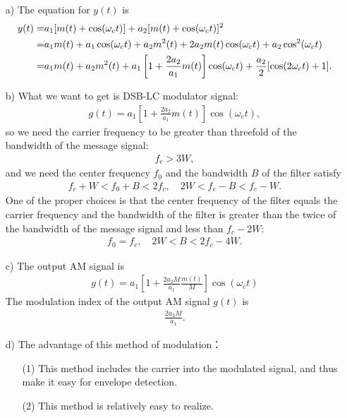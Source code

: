 \documentclass{assignment}
\begin{document}
\begin{sol}
    \begin{itemize}
        \item[a)] The equation for $y(t)$ is
        \begin{align}
            \notag y(t)=&a_1[m(t)+\cos(\omega_ct)]+a_2[m(t)+\cos(\omega_ct)]^2\\
            \notag=&a_1m(t)+a_1\cos(\omega_ct)+a_2m^2(t)+2a_2m(t)\cos(\omega_ct)+a_2\cos^2(\omega_ct)\\
            =&a_1m(t)+a_2m^2(t)+a_1\left[1+\frac{2a_2}{a_1}m(t)\right]\cos(\omega_ct)+\frac{a_2}{2}[\cos(2\omega_ct)+1].
        \end{align}
        \item[b)] What we want to get is DSB-LC modulator signal:
        \begin{align}
            g(t)=a_1\left[1+\frac{2a_2}{a_1}m(t)\right]\cos(\omega_ct),
        \end{align}
        so we need the carrier frequency to be greater than threefold of the bandwidth of the message signal:
        \begin{align}
            f_c>3W,
        \end{align}
        and we need the center frequency $f_0$ and the bandwidth $B$ of the filter satisfy
        \begin{align}
            f_c+W<f_0+B<2f_c,\quad 2W<f_c-B<f_c-W.
        \end{align}
        One of the proper choices is that the center frequency of the filter equals the carrier frequency and the bandwidth of the filter is greater than the twice of the bandwidth of the message signal and less than $f_c-2W$:
        \begin{align}
            f_0=f_c,\quad 2W<B<2f_c-4W.
        \end{align}
        \item[c)] The output AM signal is
        \begin{align}
            g(t)=a_1\left[1+\frac{2a_2M}{a_1}\frac{m(t)}{M}\right]\cos(\omega_ct)
        \end{align}
        The modulation index of the output AM signal $g(t)$ is
        \begin{align}
            \frac{2a_2M}{a_1}.
        \end{align}
        \item[d)] The advantage of this method of modulation：
        \begin{itemize}
            \item[(1)] This method includes the carrier into the modulated signal, and thus make it easy for envelope detection.
            \item[(2)] This method is relatively easy to realize.
        \end{itemize}
    \end{itemize}
\end{sol}
\end{document}
